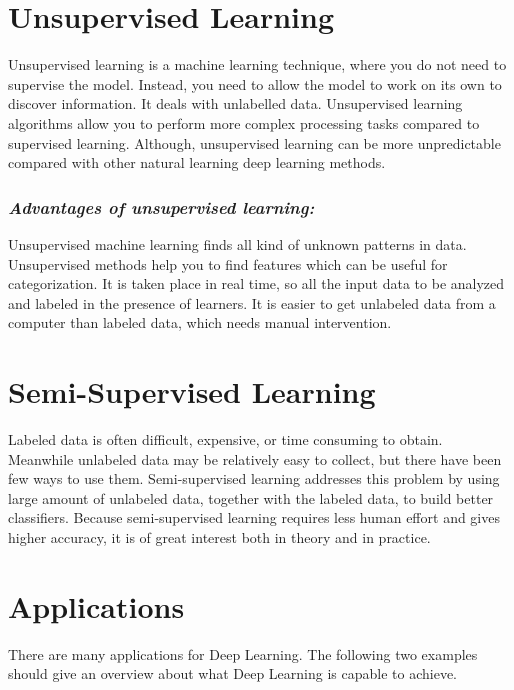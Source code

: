 \section{Unsupervised Learning}
Unsupervised learning is a machine learning technique, where you do not need to supervise the model. Instead, you need to allow the model to work on its own to discover information. It deals with unlabelled data. Unsupervised learning algorithms allow you to perform more complex processing tasks compared to supervised learning. Although, unsupervised learning can be more unpredictable compared with other natural learning deep learning methods.

\subsubsection{\textit{Advantages of unsupervised learning:}}
Unsupervised machine learning finds all kind of unknown patterns in data.
Unsupervised methods help you to find features which can be useful for categorization.
It is taken place in real time, so all the input data to be analyzed and labeled in the presence of learners.
It is easier to get unlabeled data from a computer than labeled data, which needs manual intervention.

\section{Semi-Supervised Learning}
Labeled data is often difficult, expensive, or time consuming to obtain.  Meanwhile unlabeled data may be relatively easy to collect, but there have been few ways to use them. Semi-supervised learning addresses this problem by using large amount of unlabeled data, together with the labeled data, to build better classifiers. Because semi-supervised learning requires less human effort and gives higher accuracy, it is of great interest both in theory and in practice.

\section{Applications}

There are many applications for Deep Learning. The following two examples should give an overview about what Deep Learning is capable to achieve. 

